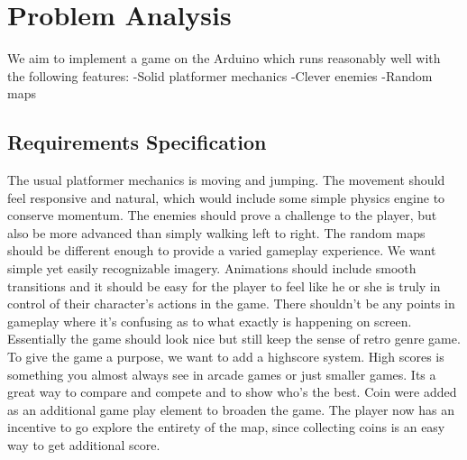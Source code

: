 \chapter{Problem Analysis}
We aim to implement a game on the Arduino which runs reasonably well with the following features:
-Solid platformer mechanics
-Clever enemies
-Random maps

\section{Requirements Specification}
The usual platformer mechanics is moving and jumping. The movement should feel responsive and natural, which would include some simple physics engine to conserve momentum. The enemies should prove a challenge to the player, but also be more advanced than simply walking left to right. The random maps should be different enough to provide a varied gameplay experience.
We want simple yet easily recognizable imagery. Animations should include smooth transitions and it should be easy for the player to feel like he or she is truly in control of their character's actions in the game. There shouldn't be any points in gameplay where it's confusing as to what exactly is happening on screen. Essentially the game should look nice but still keep the sense of retro genre game. To give the game a purpose, we want to add a highscore system. High scores is something you almost always see in arcade games or just smaller games. Its a great way to compare and compete and to show who's the best.
\newline
Coin were added as an additional game play element to broaden the game. The player now has an incentive to go explore the entirety of the map, since collecting coins is an easy way to get additional score.
